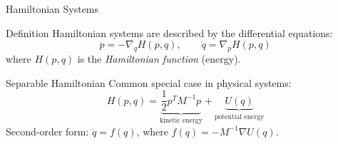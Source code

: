 \documentclass[aspectratio=169]{beamer}
\begin{document}
\begin{frame}{Hamiltonian Systems}
\begin{block}{Definition}
Hamiltonian systems are described by the differential equations:
\begin{equation*}
    \dot{p} = -\nabla_q H(p,q), \qquad \dot{q} = \nabla_p H(p,q)
\end{equation*}
where $H(p,q)$ is the \emph{Hamiltonian function} (energy).
\end{block}

\vspace{0.2cm}

\begin{block}{Separable Hamiltonian}
Common special case in physical systems:
\begin{equation*}
    H(p,q) = \underbrace{\frac{1}{2} p^{T} M^{-1} p}_{\text{kinetic energy}} + \underbrace{U(q)}_{\text{potential energy}}
\end{equation*}
\vspace{-0.1cm}
\small
Second-order form: $\ddot{q} = f(q)$, where $f(q) = -M^{-1} \nabla U(q)$.
\end{block}
\end{frame}
\end{document}
